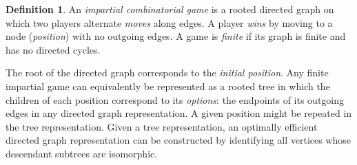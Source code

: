 \documentclass[12pt]{amsart}
\numberwithin{equation}{section}
\theoremstyle{definition}
\newtheorem{defn}[thm]{Definition}
\begin{document}
\begin{defn}\label{d:gameGraph}
An \emph{impartial combinatorial game} is a rooted directed graph on
which two players alternate \emph{moves} along edges.  A player
\emph{wins} by moving to a node (\emph{position}) with no outgoing
edges.  A game is \emph{finite} if its graph is finite and has no
directed cycles.
\end{defn}

The root of the directed graph corresponds to the \emph{initial
position}.  Any finite impartial game can equivalently be represented
as a rooted tree in which the children of each position correspond to
its \emph{options}: the endpoints of its outgoing edges in any
directed graph representation.  A given position might be repeated in
the tree representation.  Given a tree representation, an optimally
efficient directed graph representation can be constructed by
identifying all vertices whose descendant subtrees are isomorphic.
\end{document}
